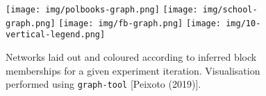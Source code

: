 \begin{figure}[!ht]
	\centering
	\texttt{[image: img/polbooks-graph.png]}
	\texttt{[image: img/school-graph.png]}
	\texttt{[image: img/fb-graph.png]}
	\texttt{[image: img/10-vertical-legend.png]}
	\caption{Networks laid out and coloured according to inferred block memberships for a given experiment iteration. Visualisation performed using \texttt{graph-tool} [Peixoto (2019)].}
	\label{fig:graphs-all}
\end{figure}
%
\begin{table}[!ht]
	\centering
	\caption{Experimental results averaged over $n=10$ iterations (mean $\pm$ std. dev.).}
	\label{tab:results}
\end{table}
